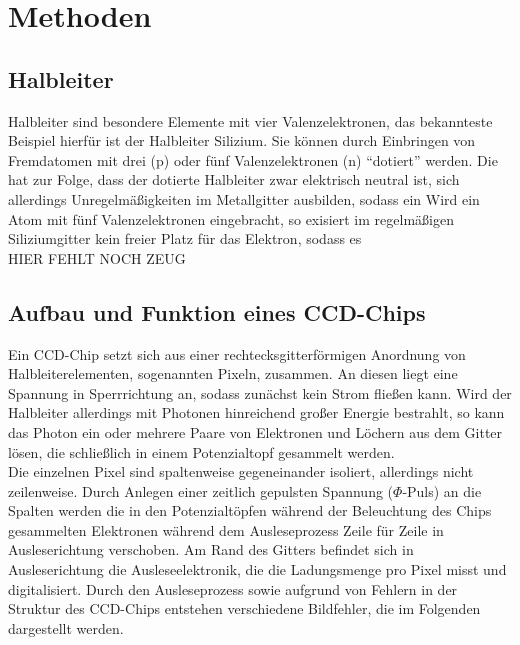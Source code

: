 \section{Methoden}
\subsection{Halbleiter}
Halbleiter sind besondere Elemente mit vier Valenzelektronen, das bekannteste Beispiel hierfür ist der Halbleiter Silizium. Sie können durch Einbringen von Fremdatomen mit drei (p) oder fünf Valenzelektronen (n)  \enquote{dotiert} werden. Die hat zur Folge, dass der dotierte Halbleiter zwar elektrisch neutral ist, sich allerdings Unregelmäßigkeiten im Metallgitter ausbilden, sodass ein
Wird ein Atom mit fünf Valenzelektronen eingebracht, so exisiert im regelmäßigen Siliziumgitter kein freier Platz für das Elektron, sodass es \\
HIER FEHLT NOCH ZEUG

\subsection{Aufbau und Funktion eines CCD-Chips}
Ein CCD-Chip setzt sich aus einer rechtecksgitterförmigen Anordnung von Halbleiterelementen, sogenannten Pixeln, zusammen. An diesen liegt eine Spannung in Sperrrichtung an, sodass zunächst kein Strom fließen kann. Wird der Halbleiter allerdings mit Photonen hinreichend großer Energie bestrahlt, so kann das Photon ein oder mehrere Paare von Elektronen und Löchern aus dem Gitter lösen, die schließlich in einem Potenzialtopf gesammelt werden. \\
Die einzelnen Pixel sind spaltenweise gegeneinander isoliert, allerdings nicht zeilenweise. Durch Anlegen einer zeitlich gepulsten Spannung ($\Phi$-Puls) an die Spalten werden die in den Potenzialtöpfen während der Beleuchtung des Chips gesammelten Elektronen während dem Ausleseprozess Zeile für Zeile in Ausleserichtung verschoben. Am Rand des Gitters befindet sich in Ausleserichtung die Ausleseelektronik, die die Ladungsmenge pro Pixel misst und digitalisiert. Durch den Ausleseprozess sowie aufgrund von Fehlern in der Struktur des CCD-Chips entstehen verschiedene Bildfehler, die im Folgenden dargestellt werden. 

